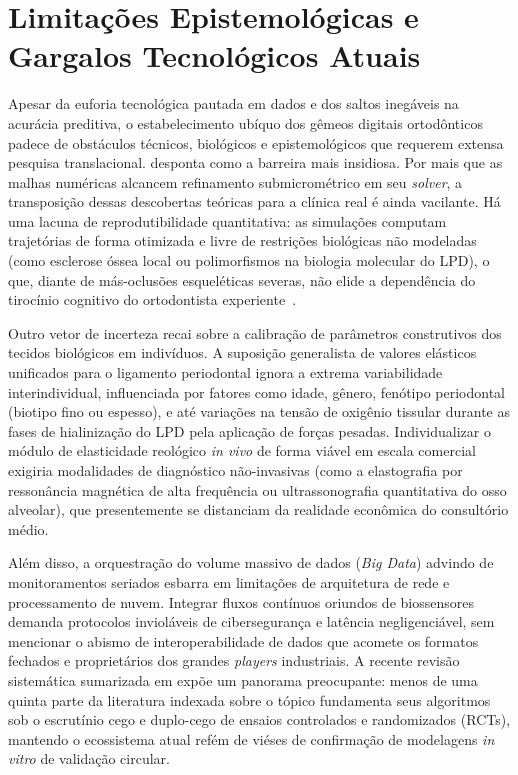 \section{Limitações Epistemológicas e Gargalos Tecnológicos Atuais}

Apesar da euforia tecnológica pautada em dados e dos saltos inegáveis na acurácia preditiva, o estabelecimento ubíquo dos gêmeos digitais ortodônticos padece de obstáculos técnicos, biológicos e epistemológicos que requerem extensa pesquisa translacional.  desponta como a barreira mais insidiosa. Por mais que as malhas numéricas alcancem refinamento submicrométrico em seu \textit{solver}, a transposição dessas descobertas teóricas para a clínica real é ainda vacilante. Há uma lacuna de reprodutibilidade quantitativa: as simulações computam trajetórias de forma otimizada e livre de restrições biológicas não modeladas (como esclerose óssea local ou polimorfismos na biologia molecular do LPD), o que, diante de más-oclusões esqueléticas severas, não elide a dependência do tirocínio cognitivo do ortodontista experiente~\cite{duggal2026exploring}.

Outro vetor de incerteza recai sobre a calibração de parâmetros construtivos dos tecidos biológicos em indivíduos. A suposição generalista de valores elásticos unificados para o ligamento periodontal ignora a extrema variabilidade interindividual, influenciada por fatores como idade, gênero, fenótipo periodontal (biotipo fino ou espesso), e até variações na tensão de oxigênio tissular durante as fases de hialinização do LPD pela aplicação de forças pesadas. Individualizar o módulo de elasticidade reológico \textit{in vivo} de forma viável em escala comercial exigiria modalidades de diagnóstico não-invasivas (como a elastografia por ressonância magnética de alta frequência ou ultrassonografia quantitativa do osso alveolar), que presentemente se distanciam da realidade econômica do consultório médio.

Além disso, a orquestração do volume massivo de dados (\textit{Big Data}) advindo de monitoramentos seriados esbarra em limitações de arquitetura de rede e processamento de nuvem. Integrar fluxos contínuos oriundos de biossensores demanda protocolos invioláveis de cibersegurança e latência negligenciável, sem mencionar o abismo de interoperabilidade de dados que acomete os formatos fechados e proprietários dos grandes \textit{players} industriais. A recente revisão sistemática sumarizada em \cite{duggal2026exploring} expõe um panorama preocupante: menos de uma quinta parte da literatura indexada sobre o tópico fundamenta seus algoritmos sob o escrutínio cego e duplo-cego de ensaios controlados e randomizados (RCTs), mantendo o ecossistema atual refém de viéses de confirmação de modelagens \textit{in vitro} de validação circular.

